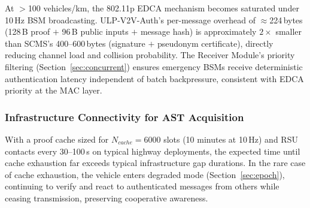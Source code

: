 At $>$100 vehicles/km, the 802.11p EDCA mechanism becomes saturated under 10\,Hz
BSM broadcasting. ULP-V2V-Auth's per-message overhead of $\approx$224\,bytes
(128\,B proof $+$ 96\,B public inputs $+$ message hash) is approximately $2\times$
smaller than SCMS's 400--600\,bytes (signature $+$ pseudonym certificate), directly
reducing channel load and collision probability. The Receiver Module's priority
filtering (Section~\ref{sec:concurrent}) ensures emergency BSMs receive deterministic
authentication latency independent of batch backpressure, consistent with EDCA
priority at the MAC layer.

\subsubsection{Infrastructure Connectivity for AST Acquisition}

With a proof cache sized for $N_{cache}=6000$ slots (10 minutes at 10\,Hz) and RSU
contacts every 30--100\,s on typical highway deployments, the expected time until
cache exhaustion far exceeds typical infrastructure gap durations. In the rare case
of cache exhaustion, the vehicle enters degraded mode (Section~\ref{sec:epoch}),
continuing to verify and react to authenticated messages from others while ceasing
transmission, preserving cooperative awareness.
